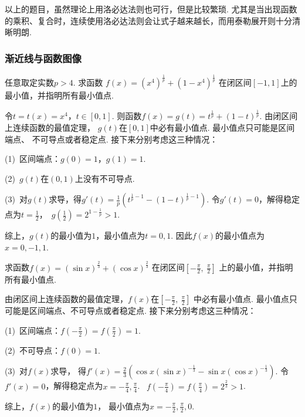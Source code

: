 以上的题目，虽然理论上用洛必达法则也可行，但是比较繁琐.
尤其是当出现函数的乘积、复合时，连续使用洛必达法则会让式子越来越长，而用泰勒展开则十分清晰明朗.

\subsubsection{渐近线与函数图像}

\begin{example}[2022 B卷]
\label{ex:ch04-19}
任意取定实数$p > 4$. 求函数
$f(x) = (x^4)^{\frac{1}{p}}+ (1-x^4)^{\frac{1}{p}}$
在闭区间$[-1,1]$上的最小值，并指明所有最小值点.
\end{example}

\begin{solution}
令$t = t(x)= x^4$，$t \in [0,1]$.
则函数$f(x) = g(t) = t^{\frac{1}{p}} + (1-t)^{\frac{1}{p}}$.
由闭区间上连续函数的最值定理，
$g(t)$在$[0,1]$中必有最小值点.
最小值点只可能是区间端点、
不可导点或者稳定点.
接下来分别考虑这三种情况：

(1)~区间端点：$g(0)=1$，$g(1)=1$.

(2)~$g(t)$在$(0,1)$上没有不可导点.

(3)~对$g(t)$求导，得$g'(t) = \frac{1}{p}\left(t^{\frac{1}{p}-1} - (1-t)^{\frac{1}{p}-1}\right)$.
令$g'(t) = 0$，解得稳定点为$t = \frac{1}{2}$，~$g(\frac{1}{2}) = 2^{1-\frac{1}{p}} > 1$.

综上，$g(t)$的最小值为$1$，最小值点为$t=0,1$.
因此$f(x)$的最小值点为$x = 0,-1,1$.
\end{solution}

\begin{example}[2022]
\label{ex:ch04-20}
求函数$f(x) = (\sin x)^{\frac{2}{3}}+ (\cos x)^{\frac{2}{3}}$
在闭区间$\left[ -\frac{\pi}{2} , ~\frac{\pi}{2}  \right]$
上的最小值，并指明所有最小值点.
\end{example}

\begin{solution}
由闭区间上连续函数的最值定理，$f(x)$在$\left[ -\frac{\pi}{2} , ~\frac{\pi}{2}  \right]$
中必有最小值点.
最小值点只可能是区间端点、不可导点或者稳定点.
接下来分别考虑这三种情况：

(1)~区间端点：$f \left( -\frac{\pi}{2} \right) = f \left(\frac{\pi}{2} \right) = 1$.

(2)~不可导点：$f(0) = 1$.

(3)~对$f(x)$求导，
得$f'(x) = \frac{2}{3}\left( \cos x(\sin x)^{-\frac{1}{3}}  - \sin x(\cos x)^{-\frac{1}{3}}  \right)$.
令$f'(x) = 0$，解得稳定点为$x = -\frac{\pi}{4},\frac{\pi}{4}$.
~$f \left(-\frac{\pi}{4}\right) = f\left(\frac{\pi}{4}\right) = 2^{\frac{2}{3}} > 1$.

综上，$f(x)$的最小值为$1$，
最小值点为$x = -\frac{\pi}{2},\frac{\pi}{2},0$.
\end{solution}

